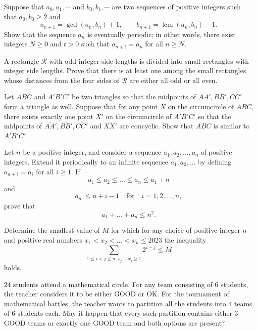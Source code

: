 \documentclass[11pt]{scrartcl}
\begin{document}
\begin{problem}[857386332886077]
Suppose that $a_0, a_1, \cdots $ and $b_0, b_1, \cdots$ are two sequences of positive integers such that $a_0, b_0 \ge 2$ and\[ a_{n+1} = \gcd{(a_n, b_n)} + 1, \qquad b_{n+1} = \operatorname{lcm}{(a_n, b_n)} - 1. \]Show that the sequence $a_n$ is eventually periodic; in other words, there exist integers $N \ge 0$ and $t > 0$ such that $a_{n+t} = a_n$ for all $n \ge N$.
\end{problem}
\begin{problem}[514046395982396]
A rectangle $\mathcal{R}$ with odd integer side lengths is divided into small rectangles with integer side lengths. Prove that there is at least one among the small rectangles whose distances from the four sides of $\mathcal{R}$ are either all odd or all even.
\end{problem}
\begin{problem}[915997916422887]
	Let $ABC$ and $A'B'C'$ be two triangles so that the midpoints of $\overline{AA'}, \overline{BB'}, \overline{CC'}$ form a triangle as well. Suppose that for any point $X$ on the circumcircle of $ABC$, there exists exactly one point $X'$ on the circumcircle of $A'B'C'$ so that the midpoints of $\overline{AA'}, \overline{BB'}, \overline{CC'}$ and $\overline{XX'}$ are concyclic. Show that $ABC$ is similar to $A'B'C'$.
\end{problem}
\begin{problem}[629259075127282]
Let $n$ be a positive integer, and consider a sequence $a_1 , a_2 , \dotsc , a_n $ of positive integers. Extend it periodically to an infinite sequence $a_1 , a_2 , \dotsc $ by defining $a_{n+i} = a_i $ for all $i \ge 1$. If\[a_1 \le a_2 \le \dots \le a_n \le a_1 +n  \]and\[a_{a_i } \le n+i-1 \quad\text{for}\quad i=1,2,\dotsc, n, \]prove that\[a_1 + \dots +a_n \le n^2. \]
\end{problem}
\begin{problem}[678030172296176]
Determine the smallest value of $M$ for which for any choice of positive integer $n$ and positive real numbers $x_1<x_2<\ldots<x_n \le 2023$ the inequality
$$\sum_{1\le i < j \le n , x_j-x_i \ge 1} 2^{i-j}\le M$$holds.
\end{problem}
\begin{problem}[4415914581303660291]
$24$ students attend a mathematical circle. For any team consisting of $6$ students, the teacher considers it to be either GOOD or OK. For the tournament of mathematical battles, the teacher wants to partition all the students into $4$ teams of $6$ students each. May it happen that every such partition contains either $3$ GOOD teams or exactly one GOOD team and both options are present?
\end{problem}
\end{document}
